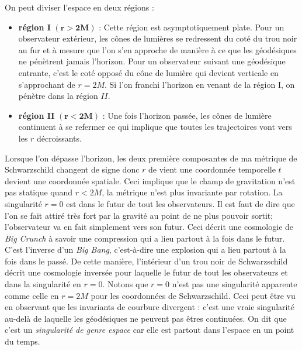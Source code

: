 \documentclass[a4paper,11pt]{report}
\begin{document}
            On peut diviser l'espace en deux régions :
            \begin{itemize}[label = \textbullet]
                \item \textbf{région I} $(\bm{r>2M})$ :  Cette région est asymptotiquement plate. Pour un observateur extérieur, les cônes de lumières se redressent du coté du trou noir au fur et à mesure que l'on s'en approche de manière à ce que les géodésiques ne pénètrent jamais l'horizon. Pour un observateur suivant une géodésique entrante, c'est le coté opposé du cône de lumière qui devient verticale en s'approchant de $r=2M$. Si l'on franchi l'horizon en venant de la région I, on pénètre dans la région $II$. 
                \item \textbf{région II} $(\bm{r<2M})$ : Une fois l'horizon passée, les cônes de lumière continuent à se refermer ce qui implique que toutes les trajectoires vont vers les $r$ décroissants.
            \end{itemize}
            Lorsque l'on dépasse l'horizon, les deux première composantes de ma métrique de Schwarzschild changent de signe donc $r$ de vient une coordonnée temporelle $t$ devient une coordonnée spatiale. Ceci implique que le champ de gravitation n'est pas statique quand $r<2M$, la métrique n'est plus invariante par rotation. La singularité $r=0$ est dans le futur de tout les observateurs. Il est faut de dire que l'on se fait attiré très fort par la gravité au point de ne plus pouvoir sortit; l'observateur va en fait simplement vers son futur. Ceci décrit une cosmologie de \textit{Big Crunch} à savoir une compression qui a lieu partout à la fois dans le futur. C'est l'inverse d'un \textit{Big Bang}, c'est-à-dire une explosion qui a lieu partout à la fois dans le passé. De cette manière, l'intérieur d'un trou noir de Schwarzschild décrit une cosmologie inversée pour laquelle le futur de tout les observateurs et dans la singularité en $r=0$. Notons que $r=0$ n'est pas une singularité apparente comme celle en $r=2M$ pour les coordonnées de Schwarzschild. Ceci peut être vu en observant que les invariants de courbure divergent : c'est une vraie singularité au-delà de laquelle les géodésiques ne peuvent pas êtres continuées. On dit que c'est un \textit{singularité de genre espace} car elle est partout dans l'espace en un point du temps.\\
            
            
\end{document}
